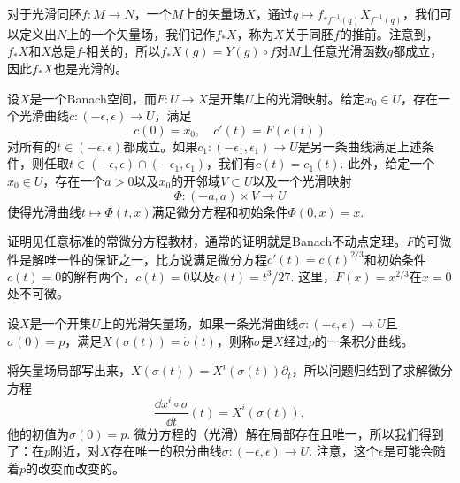 \begin{para}[矢量场的推前]
对于光滑同胚$f:M\to N$，一个$M$上的矢量场$X$，通过$q\mapsto f_{*f^{-1}(q)}X_{f^{-1}(q)}$，我们可以定义出$N$上的一个矢量场，我们记作$f_*X$，称为$X$关于同胚$f$的推前。注意到，$f_*X$和$X$总是$f$-相关的，所以$f_*X(g)=Y(g)\circ f$对$M$上任意光滑函数$g$都成立，因此$f_*X$也是光滑的。
\end{para}



\begin{thm}[常微分方程解的存在唯一性]\label{odethm}
设$X$是一个Banach空间，而$F:U\to X$是开集$U$上的光滑映射。给定$x_0\in U$，存在一个光滑曲线$c:(-\epsilon,\epsilon)\to U$，满足
\[
	c(0)=x_0,\quad c'(t)=F(c(t))
\]
对所有的$t\in (-\epsilon,\epsilon)$都成立。如果$c_1:(-\epsilon_1,\epsilon_1)\to U$是另一条曲线满足上述条件，则任取$t\in (-\epsilon,\epsilon)\cap (-\epsilon_1,\epsilon_1)$，我们有$c(t)=c_1(t)$. 此外，给定一个$x_0\in U$，存在一个$a>0$以及$x_0$的开邻域$V\subset U$以及一个光滑映射
\[
	\Phi:(-a,a)\times V\to U
\]
使得光滑曲线$t\mapsto \Phi(t,x)$满足微分方程和初始条件$\Phi(0,x)=x$.
\end{thm}

证明见任意标准的常微分方程教材，通常的证明就是Banach不动点定理。$F$的可微性是解唯一性的保证之一，比方说满足微分方程$c'(t)=c(t)^{2/3}$和初始条件$c(t)=0$的解有两个，$c(t)=0$以及$c(t)=t^3/27$. 这里，$F(x)=x^{2/3}$在$x=0$处不可微。

\begin{para}[积分曲线]
设$X$是一个开集$U$上的光滑矢量场，如果一条光滑曲线$\sigma:(-\epsilon,\epsilon)\to U$且$\sigma(0)=p$，满足$X(\sigma(t))=\dot{\sigma}(t)$，则称$\sigma$是$X$经过$p$的一条积分曲线。

将矢量场局部写出来，$X(\sigma(t))=X^i(\sigma(t))\partial_t$，所以问题归结到了求解微分方程
\[
	\frac{\dd x^i\circ \sigma}{\dd t}(t)=X^i(\sigma(t)),
\]
他的初值为$\sigma(0)=p$. 微分方程的（光滑）解在局部存在且唯一，所以我们得到了：在$p$附近，对$X$存在唯一的积分曲线$\sigma:(-\epsilon,\epsilon)\to U$. 注意，这个$\epsilon$是可能会随着$p$的改变而改变的。
\end{para}

